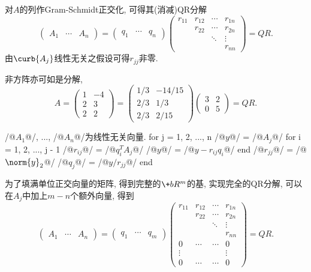 \documentclass[20pt]{extarticle}
\begin{document}
对$A$的列作Gram-Schmidt正交化, 可得其(消减)QR分解
\[ \begin{pmatrix}
    A_1 & \cdots & A_n
\end{pmatrix} = \begin{pmatrix}
    q_1 & \cdots & q_n
\end{pmatrix}\begin{pmatrix}
    r_{11} & r_{12} & \cdots & r_{1n} \\
    & r_{22} & \cdots & r_{2n} \\
    & & \ddots & \vdots \\
    & & & r_{nn}
\end{pmatrix} = QR. \]
由$\curb{A_j}$线性无关之假设可得$r_{jj}$非零.
\begin{ex}
    非方阵亦可如是分解,
    \[ A = \begin{pmatrix}
        1 & -4 \\
        2 & 3 \\
        2 & 2
    \end{pmatrix} = \begin{pmatrix}
        1/3 & -14/15 \\
        2/3 & 1/3 \\
        2/3 & 2/15
    \end{pmatrix} \begin{pmatrix}
        3 & 2 \\
        0 & 5
    \end{pmatrix} = QR. \]
\end{ex}
\begin{matlablst}
/@$A_1$@/, ..., /@$A_n$@/为线性无关向量.
for j = 1, 2, ..., n
    /@$y$@/ = /@$A_j$@/
    for i = 1, 2, ..., j - 1
        /@$r_{ij}$@/ = /@$q_i^T A_j$@/
        /@$y$@/ = /@$y - r_{ij}q_i$@/
    end
    /@$r_{jj}$@/ = /@$\norm{y}_2$@/
    /@$q_j$@/ = /@$y/r_{jj}$@/
end
\end{matlablst}
为了填满单位正交向量的矩阵, 得到完整的$\+bR^m$的基, 实现完全的QR分解, 可以在$A_j$中加上$m-n$个额外向量, 得到
\[ \begin{pmatrix}
    A_1 & \cdots & A_n
\end{pmatrix} = \begin{pmatrix}
    q_1 & \cdots & q_m
\end{pmatrix}\begin{pmatrix}
    r_{11} & r_{12} & \cdots & r_{1n} \\
    & r_{22} & \cdots & r_{2n} \\
    & & \ddots & \vdots \\
    & & & r_{nn} \\
    0 & \cdots & \cdots & 0 \\
    \vdots & & & \vdots \\
    0 & \cdots & \cdots & 0
\end{pmatrix} = QR. \]
\end{document}
